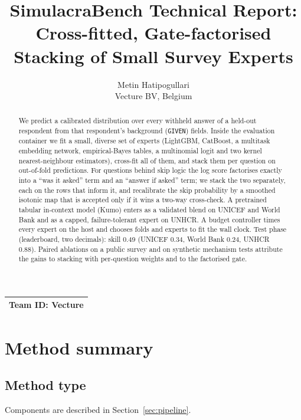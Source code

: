\documentclass{article}
\title{SimulacraBench Technical Report:\\ Cross-fitted, Gate-factorised Stacking of Small Survey Experts}
\author{%
  Metin Hatipogullari\\
  Vecture BV, Belgium\\
  \texttt{\authoremail}
}
\newcommand{\teamid}{Vecture}
\begin{document}
\maketitle

\begin{center}
\begin{tabular}{l}
\toprule
\textbf{Team ID:} \teamid \\
\bottomrule
\end{tabular}
\end{center}

\begin{abstract}
We predict a calibrated distribution over every withheld answer of a held-out respondent from that respondent's background (\texttt{GIVEN}) fields. Inside the evaluation container we fit a small, diverse set of experts (LightGBM, CatBoost, a multitask embedding network, empirical-Bayes tables, a multinomial logit and two kernel nearest-neighbour estimators), cross-fit all of them, and stack them per question on out-of-fold predictions. For questions behind skip logic the log score factorises exactly into a ``was it asked'' term and an ``answer if asked'' term; we stack the two separately, each on the rows that inform it, and recalibrate the skip probability by a smoothed isotonic map that is accepted only if it wins a two-way cross-check. A pretrained tabular in-context model (Kumo) enters as a validated blend on UNICEF and World Bank and as a capped, failure-tolerant expert on UNHCR. A budget controller times every expert on the host and chooses folds and experts to fit the wall clock. Test phase (leaderboard, two decimals): skill 0.49 (UNICEF 0.34, World Bank 0.24, UNHCR 0.88). Paired ablations on a public survey and on synthetic mechanism tests attribute the gains to stacking with per-question weights and to the factorised gate.
\end{abstract}

\section{Method summary}
\label{sec:method}

\subsection{Method type}
Components are described in Section~\ref{sec:pipeline}.
\end{document}
